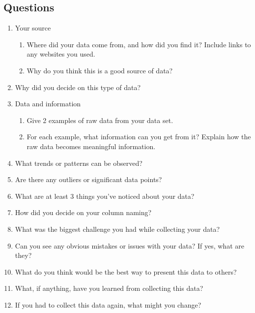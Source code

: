 \documentclass[12pt]{article}
\begin{document}
\subsection*{Questions}
    \begin{enumerate}
        \item Your source
        \begin{enumerate}
            \item Where did your data come from, and how did you find it? Include links to any websites you used.
            \item Why do you think this is a good source of data?
        \end{enumerate}
        \item Why did you decide on this type of data?
        \item Data and information
        \begin{enumerate}
            \item Give 2 examples of raw data from your data set.
            \item For each example, what information can you get from it? Explain how the raw data becomes meaningful information.
        \end{enumerate}
        \item What trends or patterns can be observed?
        \item Are there any outliers or significant data points?
        \item What are at least 3 things you've noticed about your data?
        \item How did you decide on your column naming?
        \item What was the biggest challenge you had while collecting your data?
        \item Can you see any obvious mistakes or issues with your data? If yes, what are they?
        \item What do you think would be the best way to present this data to others?
        \item What, if anything, have you learned from collecting this data?
        \item If you had to collect this data again, what might you change?
    \end{enumerate}
\end{document}
